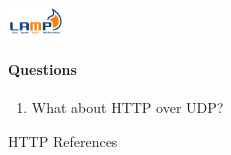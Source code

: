 \begin{frame}{\includegraphics[height=2em]{lamp-logo}}
  \begin{center}
  \end{center}
\end{frame}

\paragraph{Questions}

  \begin{enumerate}
  \item What about HTTP over UDP?
  \end{enumerate}

\begin{frame}[allowframebreaks]{HTTP References}
  \begin{refsection}
    \nocite{wiki:http, wiki:httptwo, wiki:cookie, wiki:stateless, wiki:html, wiki:lamp,
      rfc2616, rfc7540, rfc7541}
    \printbibliography[heading=none]
  \end{refsection}
\end{frame}

